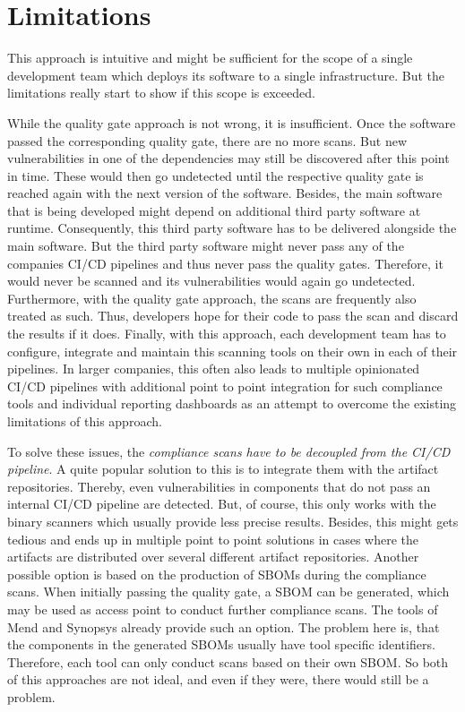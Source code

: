\section{Limitations}
This approach is intuitive and might be sufficient for the scope of a single development team which deploys its software to a single infrastructure. But the limitations really start to show if this scope is exceeded.\par
While the quality gate approach is not wrong, it is insufficient. Once the software passed the corresponding quality gate, there are no more scans. But new vulnerabilities in one of the dependencies may still be discovered after this point in time. These would then go undetected until the respective quality gate is reached again with the next version of the software. Besides, the main software that is being developed might depend on additional third party software at runtime. Consequently, this third party software has to be delivered alongside the main software. But the third party software might never pass any of the companies CI/CD pipelines and thus never pass the quality gates. Therefore, it would never be scanned and its vulnerabilities would again go undetected. Furthermore, with the quality gate approach, the scans are frequently also treated as such. Thus, developers hope for their code to pass the scan and discard the results if it does. Finally, with this approach, each development team has to configure, integrate and maintain this scanning tools on their own in each of their pipelines. In larger companies, this often also leads to multiple opinionated CI/CD pipelines with additional point to point integration for such compliance tools and individual reporting dashboards as an attempt to overcome the existing limitations of this approach.\par
To solve these issues, the \textit{compliance scans have to be decoupled from the CI/CD pipeline}. A quite popular solution to this is to integrate them with the artifact repositories. Thereby, even vulnerabilities in components that do not pass an internal CI/CD pipeline are detected. But, of course, this only works with the binary scanners which usually provide less precise results. Besides, this might gets tedious and ends up in multiple point to point solutions in cases where the artifacts are distributed over several different artifact repositories. Another possible option is based on the production of SBOMs during the compliance scans. When initially passing the quality gate, a SBOM can be generated, which may be used as access point to conduct further compliance scans. The tools of Mend and Synopsys already provide such an option. The problem here is, that the components in the generated SBOMs usually have tool specific identifiers. Therefore, each tool can only conduct scans based on their own SBOM. So both of this approaches are not ideal, and even if they were, there would still be a problem.\par
